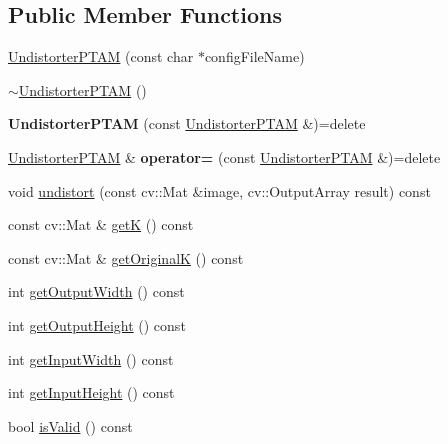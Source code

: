 \subsection*{Public Member Functions}
\begin{DoxyCompactItemize}
\item 
\hyperlink{classlsd__slam_1_1_undistorter_p_t_a_m_ac7604cab28f1987264f0da123bcc990a}{Undistorter\-P\-T\-A\-M} (const char $\ast$config\-File\-Name)
\item 
\hyperlink{classlsd__slam_1_1_undistorter_p_t_a_m_aa24a3a52c7515c04c503a33a55db2a9b}{$\sim$\-Undistorter\-P\-T\-A\-M} ()
\item 
\hypertarget{classlsd__slam_1_1_undistorter_p_t_a_m_a13fe7f2773c8fc5a901a7249fd671b93}{{\bfseries Undistorter\-P\-T\-A\-M} (const \hyperlink{classlsd__slam_1_1_undistorter_p_t_a_m}{Undistorter\-P\-T\-A\-M} \&)=delete}\label{classlsd__slam_1_1_undistorter_p_t_a_m_a13fe7f2773c8fc5a901a7249fd671b93}

\item 
\hypertarget{classlsd__slam_1_1_undistorter_p_t_a_m_a8ede83714decea8c7af0a3ebcb1b599f}{\hyperlink{classlsd__slam_1_1_undistorter_p_t_a_m}{Undistorter\-P\-T\-A\-M} \& {\bfseries operator=} (const \hyperlink{classlsd__slam_1_1_undistorter_p_t_a_m}{Undistorter\-P\-T\-A\-M} \&)=delete}\label{classlsd__slam_1_1_undistorter_p_t_a_m_a8ede83714decea8c7af0a3ebcb1b599f}

\item 
void \hyperlink{classlsd__slam_1_1_undistorter_p_t_a_m_a1e74aaffa5269b0b551d05b60419fdab}{undistort} (const cv\-::\-Mat \&image, cv\-::\-Output\-Array result) const 
\item 
const cv\-::\-Mat \& \hyperlink{classlsd__slam_1_1_undistorter_p_t_a_m_a1a569488b001379a5e75942a3aad3a0c}{get\-K} () const 
\item 
const cv\-::\-Mat \& \hyperlink{classlsd__slam_1_1_undistorter_p_t_a_m_a636b3b0d129929ab125bb9e2affa82c0}{get\-Original\-K} () const 
\item 
int \hyperlink{classlsd__slam_1_1_undistorter_p_t_a_m_a8aac80ab1305d330719e59770149ed88}{get\-Output\-Width} () const 
\item 
int \hyperlink{classlsd__slam_1_1_undistorter_p_t_a_m_ad5c88236acc3212a3612100f5e5aacb6}{get\-Output\-Height} () const 
\item 
int \hyperlink{classlsd__slam_1_1_undistorter_p_t_a_m_a70e1884e007e040d2fb0eb4081fe7520}{get\-Input\-Width} () const 
\item 
int \hyperlink{classlsd__slam_1_1_undistorter_p_t_a_m_af63d30f057b5c9a0ca1443c5a021ec2a}{get\-Input\-Height} () const 
\item 
bool \hyperlink{classlsd__slam_1_1_undistorter_p_t_a_m_a80d17a49a43a574d19faf26f07acce60}{is\-Valid} () const 
\end{DoxyCompactItemize}

